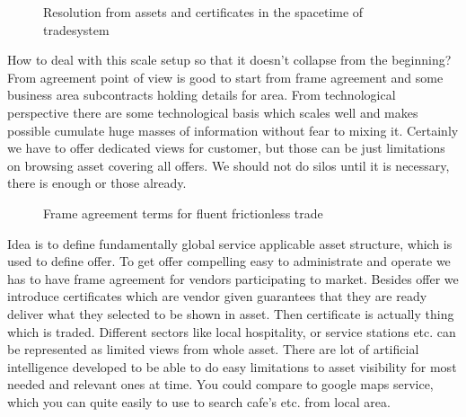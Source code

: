 \begin{figure} %
 \begin{center}
  \label{fig:resolut}
  \caption{Resolution from assets and certificates in the spacetime of
  tradesystem}
 \end{center}
\end{figure}

How to deal with this scale setup so that it doesn't collapse from the
beginning? From agreement point of view is good to start from frame agreement
and some business area subcontracts holding details for area. From
technological perspective there are some technological basis which scales well
and makes possible cumulate huge masses of information without fear to mixing
it. Certainly we have to offer dedicated views for customer, but those can be
just limitations on browsing asset covering all offers. We should not do silos
until it is necessary, there is enough or those already.

\begin{figure} %
 \begin{center}
  \label{fig:terms}
  \caption{Frame agreement terms for fluent frictionless trade}
 \end{center}
\end{figure}

Idea is to define fundamentally global service applicable asset structure,
which is used to define offer. To get offer compelling easy to administrate
and operate we has to have frame agreement for vendors participating to
market. Besides offer we introduce certificates which are vendor given
guarantees that they are ready deliver what they selected to be shown in
asset. Then certificate is actually thing which is traded. Different sectors
like local hospitality, or service stations etc. can be represented as
limited views from whole asset. There are lot of artificial intelligence
developed to be able to do easy limitations to asset visibility for most
needed and relevant ones at time. You could compare to google maps service,
which you can quite easily to use to search cafe's etc. from local area.

